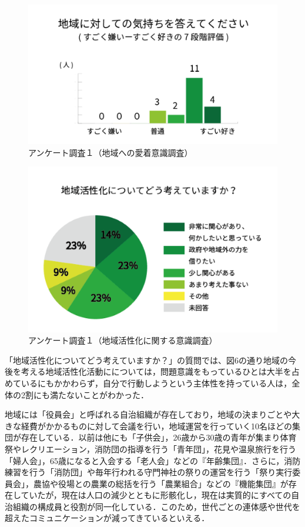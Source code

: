 \documentclass[a4paper]{jsarticle}
\begin{document}
\begin{figure}[H]
  \begin{center}
    \includegraphics[width=1.0\hsize]{./images/03.png}
    \caption{アンケート調査１（地域への愛着意識調査）}
    \label{fig:tmu_hino}
  \end{center}
\end{figure}
\begin{figure}[H]
  \begin{center}
    \includegraphics[width=1.0\hsize]{./images/02.png}
    \caption{アンケート調査１（地域活性化に関する意識調査）}
    \label{fig:tmu_hino}
  \end{center}
\end{figure}
「地域活性化についてどう考えていますか？」の質問では、図6の通り地域の今後を考える地域活性化活動にについては，問題意識をもっているひとは大半を占めているにもかかわらず，自分で行動しようという主体性を持っている人は，全体の2割にも満たないことがわかった．\par
地域には「役員会」と呼ばれる自治組織が存在しており，地域の決まりごとや大きな経費がかかるものに対して会議を行い，地域運営を行っていく10名ほどの集団が存在している．以前は他にも「子供会」，26歳から30歳の青年が集まり体育祭やレクリエーション，消防団の指導を行う「青年団」，花見や温泉旅行を行う「婦人会」，65歳になると入会する「老人会」などの『年齢集団』．さらに，消防練習を行う「消防団」や毎年行われる守門神社の祭りの運営を行う「祭り実行委員会」，農協や役場との農業の総括を行う「農業組合」などの『機能集団』が存在していたが，現在は人口の減少とともに形骸化し，現在は実質的にすべての自治組織の構成員と役割が同一化している．このため，世代ごとの連体感や世代を超えたコミュニケーションが減ってきているといえる．\par
\end{document}
